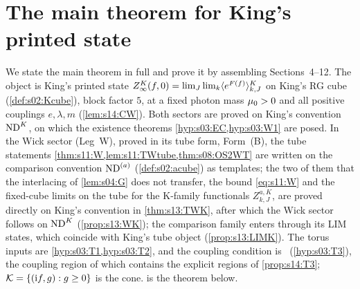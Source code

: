 \section{The main theorem for King's printed state}

We state the main theorem in full and prove it by assembling Sections~4--12. The object is King's printed state $Z^{K}_{\infty}(f,0)=\lim_J\lim_k\langle e^{F(f)}\rangle^{K}_{k,J}$ on King's RG cube (\cref{def:s02:Kcube}), block factor $5$, at a fixed photon mass $\mu_0>0$ and all positive couplings $e,\lambda,m$ (\cref{lem:s14:CW}). Both sectors are proved on King's convention $\mathrm{ND}^{K}$, on which the existence theorems \cref{hyp:s03:EC,hyp:s03:W1} are posed. In the Wick sector (Leg~W), proved in its tube form, Form~(B), the tube statements \cref{thm:s11:W,lem:s11:TWtube,thm:s08:OS2WT} are written on the comparison convention $\mathrm{ND}^{(a)}$ (\cref{def:s02:acube}) as templates; the two of them that the interlacing of \cref{lem:s04:G} does not transfer, the bound \eqref{eq:s11:W} and the fixed-cube limits on the tube for the K-family functionals $Z^{a,K}_{k,J}$, are proved directly on King's convention in \cref{thm:s13:TWK}, after which the Wick sector follows on $\mathrm{ND}^{K}$ (\cref{prop:s13:WK}); the comparison family enters through its LIM states, which coincide with King's tube object (\cref{prop:s13:LIMK}). The torus inputs are \cref{hyp:s03:T1,hyp:s03:T2}, and the coupling condition is \Tthree\ (\cref{hyp:s03:T3}), the coupling region of which contains the explicit regions of \cref{prop:s14:T3}; $\mathcal K=\{(\mathrm if,g):g\ge0\}$ is the cone.  is the theorem below.

